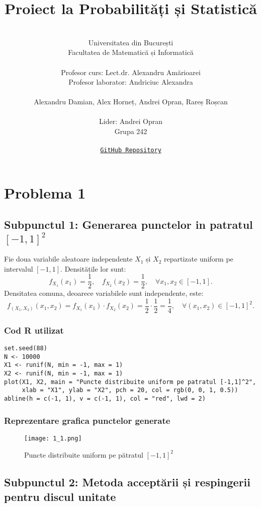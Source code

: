 \documentclass{article}
\title{\textbf{Proiect la Probabilități și Statistică}}
\author{
    \vspace{1cm} \\
    Universitatea din București \\
    Facultatea de Matematică și Informatică \\
    \vspace{0.2cm} \\
    Profesor curs: Lect.dr. Alexandru Amărioarei \\
    Profesor laborator: Andriciuc Alexandra \\
    \vspace{0.5cm} \\
    Alexandru Damian, Alex Horneț, Andrei Opran, Rareș Roșcan \\
    \vspace{0.2cm} \\ 
    Lider: Andrei Opran \\
    Grupa 242 \\
    \vspace{0.2cm} \\ 
    \href{https://github.com/andreiOpran/Prob-and-Stat}{\texttt{GitHub Repository}}
}
\date{}
\begin{document}
\maketitle

\newpage

\section {Problema 1}

\subsection{Subpunctul 1: Generarea punctelor in patratul $[-1,1]^2$}

Fie doua variabile aleatoare independente \( X_1 \) și \( X_2 \) repartizate uniform pe intervalul \( [-1,1] \). Densitățile lor sunt:
\[
f_{X_1}(x_1) = \frac{1}{2}, \quad f_{X_2}(x_2) = \frac{1}{2}, \quad \forall x_1, x_2 \in [-1,1].
\]
Densitatea comuna, deoarece variabilele sunt independente, este:
\[
f_{(X_1,X_2)}(x_1, x_2) = f_{X_1}(x_1) \cdot f_{X_2}(x_2) = \frac{1}{2} \cdot \frac{1}{2} = \frac{1}{4}, \quad \forall (x_1, x_2) \in [-1,1]^2.
\]

\subsubsection*{Cod R utilizat}
\begin{lstlisting}
set.seed(88)
N <- 10000  
X1 <- runif(N, min = -1, max = 1)
X2 <- runif(N, min = -1, max = 1)
plot(X1, X2, main = "Puncte distribuite uniform pe patratul [-1,1]^2",
     xlab = "X1", ylab = "X2", pch = 20, col = rgb(0, 0, 1, 0.5))
abline(h = c(-1, 1), v = c(-1, 1), col = "red", lwd = 2)
\end{lstlisting}

\newpage

\subsubsection*{Reprezentare grafica punctelor generate}

\begin{figure}[h]
    \centering
    \texttt{[image: 1\_1.png]}
    \caption{Puncte distribuite uniform pe pătratul $[-1,1]^2$}
    \label{fig:patrat}
\end{figure}

\newpage

\subsection{Subpunctul 2: Metoda acceptării și respingerii pentru discul unitate}
\end{document}

